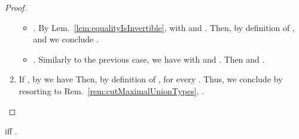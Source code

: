 \begin{proof}
\begin{enumerate}
\begin{itemize}
    \item . By Lem.~\ref{lem:equalityIsInvertible},
     with  and . Then, by definition of ,
     and we conclude
    .
    
    \item . Similarly to the previous case, we
    have  with  and . Then  and
    .
  \end{itemize}
  
  \item If , by  we have 
  Then, by definition of ,  for every . Thus,
  we conclude by resorting to Rem.~\ref{rem:cutMaximalUnionTypes},
  .
\end{enumerate}
\end{proof}



\begin{lemma}
\label{lem:cutSubtypingCo}
 iff .
\end{lemma}

